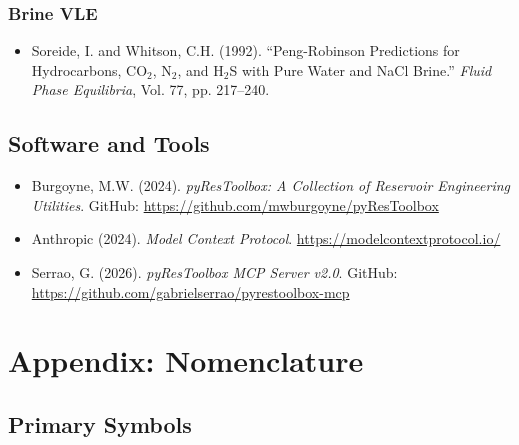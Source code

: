 \documentclass[11pt,a4paper]{article}
\begin{document}
\subsubsection{Brine VLE}
\begin{itemize}
\item Soreide, I. and Whitson, C.H. (1992). ``Peng-Robinson Predictions for Hydrocarbons, CO$_2$, N$_2$, and H$_2$S with Pure Water and NaCl Brine.'' \textit{Fluid Phase Equilibria}, Vol. 77, pp. 217--240.
\end{itemize}

\subsection{Software and Tools}
\begin{itemize}
\item Burgoyne, M.W. (2024). \textit{pyResToolbox: A Collection of Reservoir Engineering Utilities}. GitHub: \url{https://github.com/mwburgoyne/pyResToolbox}
\item Anthropic (2024). \textit{Model Context Protocol}. \url{https://modelcontextprotocol.io/}
\item Serrao, G. (2026). \textit{pyResToolbox MCP Server v2.0}. GitHub: \url{https://github.com/gabrielserrao/pyrestoolbox-mcp}
\end{itemize}

\newpage

\section{Appendix: Nomenclature}

\subsection{Primary Symbols}
\end{document}
